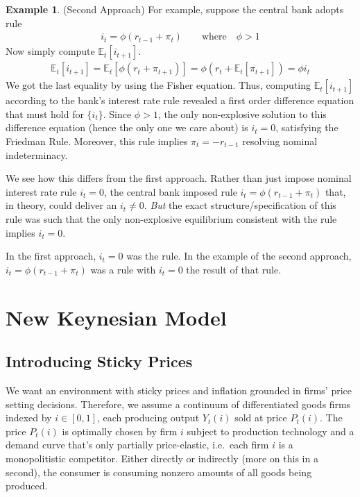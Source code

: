 \documentclass[12pt]{article}
\theoremstyle{plain}
\theoremstyle{definition}
\newtheorem{ex}[thm]{Example}
\theoremstyle{remark}
\newcommand{\E}{\mathbb{E}}
\begin{document}
\begin{ex}(Second Approach)
For example, suppose the central bank adopts rule
\begin{align*}
  i_t=\phi(r_{t-1}+\pi_t)\qquad \text{where}\quad \phi>1
\end{align*}
Now simply compute $\E_t[i_{t+1}]$.
\begin{align*}
  \E_t[i_{t+1}]
  =
  \E_t[\phi(r_t + \pi_{t+1})]
  = \phi(r_t+\E_t[\pi_{t+1}])
  =
  \phi i_t
\end{align*}
We got the last equality by using the Fisher equation. Thus,
computing $\E_t[i_{t+1}]$ according to the bank's interest rate rule
revealed a first order difference equation that must hold for
$\{i_t\}$.  Since $\phi>1$, the only non-explosive solution to this
difference equation (hence the only one we care about) is $i_t=0$,
satisfying the Friedman Rule. Moreover, this rule implies
$\pi_t=-r_{t-1}$ resolving nominal indeterminacy.

We see how this differs from the first approach. Rather than just
impose nominal interest rate rule $i_t=0$, the central bank imposed
rule $i_t=\phi(r_{t-1}+\pi_t)$ that, in theory, could deliver an
$i_t\neq 0$.  \emph{But} the exact structure/specification of this
rule was such that the only non-explosive equilibrium consistent
with the rule implies $i_t=0$.

In the first approach, $i_t=0$ was the rule. In the example of the
second approach, $i_t=\phi(r_{t-1}+\pi_t)$ was a rule with $i_t=0$ the
result of that rule.
\end{ex}





\clearpage
\section{New Keynesian Model}

\subsection{Introducing Sticky Prices}

We want an environment with sticky prices and inflation grounded in
firms' price setting decisions.
Therefore, we assume a continuum of differentiated goods firms
indexed by $i\in[0,1]$, each producing output $Y_t(i)$ sold at
price $P_t(i)$. The price $P_t(i)$ is optimally chosen by firm $i$
subject to production technology and a demand curve that's only
partially price-elastic, i.e.\ each firm $i$ is a monopolitistic
competitor.
Either directly or indirectly (more on this in a second), the consumer
is consuming nonzero amounts of all goods being produced.
\end{document}

